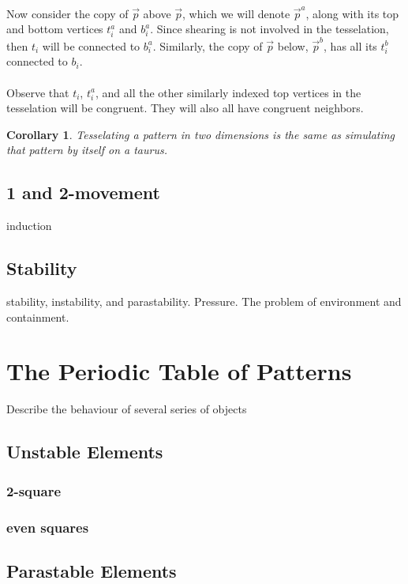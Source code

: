 \documentclass{article}
\theoremstyle{plain}
\newtheorem{corollary}{Corollary}
\theoremstyle{definition}
\begin{document}
			\paragraph{}
			Now consider the copy of
			$\vec{p}$ above $\vec{p}$, which we will denote $\vec{p}^a$, along
			with its top and bottom vertices $t^a_i$ and $b^a_i$.
			Since shearing is not involved in the tesselation, then $t_i$ will
			be connected to $b^a_i$. Similarly, the copy of $\vec{p}$ below,
			$\vec{p}^b$, has all its $t^b_i$ connected to $b_i$.
			\paragraph{}
			Observe that $t_i$, $t^a_i$, and all the other similarly indexed top
			vertices in the tesselation will be congruent. They will also all
			have congruent neighbors. 
			
			
			\begin{corollary}
				Tesselating a pattern in two dimensions is the same as
				simulating that pattern by itself on a taurus.
			\end{corollary}
		\subsection{1 and 2-movement}
			induction
		\subsection{Stability}
			stability, instability, and parastability. Pressure.
			The problem of environment and containment. 
	\section{The Periodic Table of Patterns}
		Describe the behaviour of several series of objects
		\subsection{Unstable Elements}
			\subsubsection{2-square}
			\subsubsection{even squares}
		\subsection{Parastable Elements}
\end{document}
